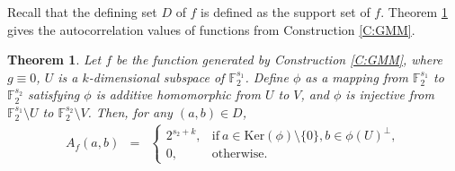 \documentclass[10pt]{article}
\newtheorem{theorem}{Theorem}
\newcommand{\F}{\mathbb{F}}
\newcommand{\0}{\textbf{0}}
\newcommand{\1}{\textbf{1}}
\begin{document}
Recall that the defining set $D$ of $f$ is defined as the support set of $f$.
Theorem \ref{thm:AC-con2} gives the autocorrelation values of functions from Construction \ref{C:GMM}.

\begin{theorem}\label{thm:AC-con2}
Let $f$ be the function generated by Construction \ref{C:GMM}, where $g\equiv 0$, $U$ is a  $k$-dimensional
subspace of $\F_2^{s_1}$.
Define $\phi$ as a mapping from $\F_2^{s_1}$ to $\F_2^{s_2}$ satisfying
$\phi$ is additive homomorphic from $U$ to $V$, and $\phi$ is injective from $\F_2^{s_1}\setminus U$ to $\F_2^{s_2}\setminus V$.
Then, for any $(a,b)\in D$,
\begin{eqnarray}
A_f(a,b)
&=& \left\{
\begin{array}{llllll}
2^{s_2+k}, & \mbox{if}~a\in \mathrm{Ker}(\phi)\setminus\{0\}, b\in \phi(U)^{\bot},\\
0,& \mbox{otherwise}.
\end{array}
\right.
\end{eqnarray}
\end{theorem}
\end{document}
